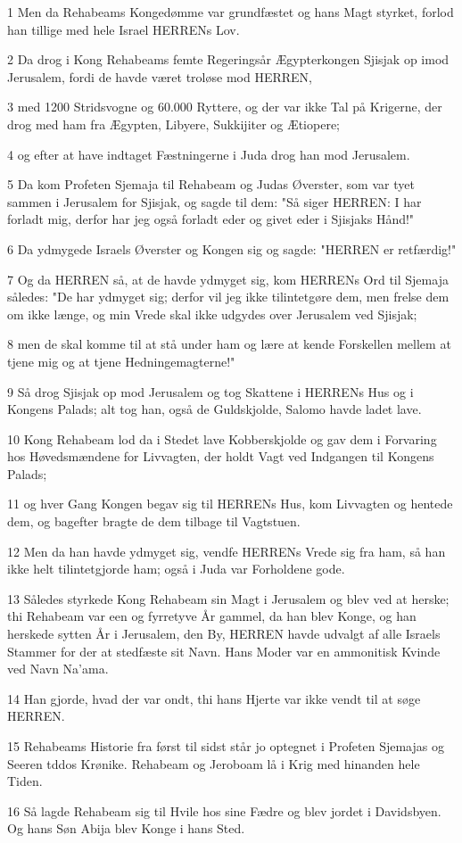 \par 1 Men da Rehabeams Kongedømme var grundfæstet og hans Magt styrket, forlod han tillige med hele Israel HERRENs Lov.
\par 2 Da drog i Kong Rehabeams femte Regeringsår Ægypterkongen Sjisjak op imod Jerusalem, fordi de havde været troløse mod HERREN,
\par 3 med 1200 Stridsvogne og 60.000 Ryttere, og der var ikke Tal på Krigerne, der drog med ham fra Ægypten, Libyere, Sukkijiter og Ætiopere;
\par 4 og efter at have indtaget Fæstningerne i Juda drog han mod Jerusalem.
\par 5 Da kom Profeten Sjemaja til Rehabeam og Judas Øverster, som var tyet sammen i Jerusalem for Sjisjak, og sagde til dem: "Så siger HERREN: I har forladt mig, derfor har jeg også forladt eder og givet eder i Sjisjaks Hånd!"
\par 6 Da ydmygede Israels Øverster og Kongen sig og sagde: "HERREN er retfærdig!"
\par 7 Og da HERREN så, at de havde ydmyget sig, kom HERRENs Ord til Sjemaja således: "De har ydmyget sig; derfor vil jeg ikke tilintetgøre dem, men frelse dem om ikke længe, og min Vrede skal ikke udgydes over Jerusalem ved Sjisjak;
\par 8 men de skal komme til at stå under ham og lære at kende Forskellen mellem at tjene mig og at tjene Hedningemagterne!"
\par 9 Så drog Sjisjak op mod Jerusalem og tog Skattene i HERRENs Hus og i Kongens Palads; alt tog han, også de Guldskjolde, Salomo havde ladet lave.
\par 10 Kong Rehabeam lod da i Stedet lave Kobberskjolde og gav dem i Forvaring hos Høvedsmændene for Livvagten, der holdt Vagt ved Indgangen til Kongens Palads;
\par 11 og hver Gang Kongen begav sig til HERRENs Hus, kom Livvagten og hentede dem, og bagefter bragte de dem tilbage til Vagtstuen.
\par 12 Men da han havde ydmyget sig, vendfe HERRENs Vrede sig fra ham, så han ikke helt tilintetgjorde ham; også i Juda var Forholdene gode.
\par 13 Således styrkede Kong Rehabeam sin Magt i Jerusalem og blev ved at herske; thi Rehabeam var een og fyrretyve År gammel, da han blev Konge, og han herskede sytten År i Jerusalem, den By, HERREN havde udvalgt af alle Israels Stammer for der at stedfæste sit Navn. Hans Moder var en ammonitisk Kvinde ved Navn Na'ama.
\par 14 Han gjorde, hvad der var ondt, thi hans Hjerte var ikke vendt til at søge HERREN.
\par 15 Rehabeams Historie fra først til sidst står jo optegnet i Profeten Sjemajas og Seeren tddos Krønike. Rehabeam og Jeroboam lå i Krig med hinanden hele Tiden.
\par 16 Så lagde Rehabeam sig til Hvile hos sine Fædre og blev jordet i Davidsbyen. Og hans Søn Abija blev Konge i hans Sted.

